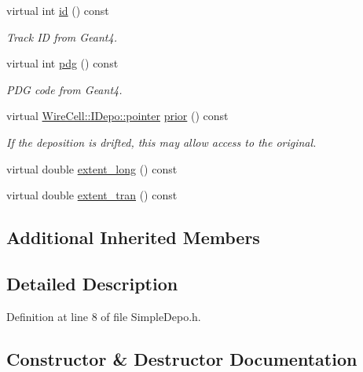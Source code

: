 \begin{DoxyCompactItemize}
virtual int \hyperlink{class_wire_cell_1_1_simple_depo_a30d9b06e6e65bba3d0b4fa17f64c52f5}{id} () const
\begin{DoxyCompactList}\small\item\em Track ID from Geant4. \end{DoxyCompactList}\item 
virtual int \hyperlink{class_wire_cell_1_1_simple_depo_a632331ca715c30e2600b2b115139fb0d}{pdg} () const
\begin{DoxyCompactList}\small\item\em P\+DG code from Geant4. \end{DoxyCompactList}\item 
virtual \hyperlink{class_wire_cell_1_1_i_data_aff870b3ae8333cf9265941eef62498bc}{Wire\+Cell\+::\+I\+Depo\+::pointer} \hyperlink{class_wire_cell_1_1_simple_depo_a23c734fee4ed0184b032e99a193f6f8e}{prior} () const
\begin{DoxyCompactList}\small\item\em If the deposition is drifted, this may allow access to the original. \end{DoxyCompactList}\item 
virtual double \hyperlink{class_wire_cell_1_1_simple_depo_aebb13d9a9c5a5bc0f821d2e690c88c46}{extent\+\_\+long} () const
\item 
virtual double \hyperlink{class_wire_cell_1_1_simple_depo_ac03d9904acf5117c23c363c7168310cd}{extent\+\_\+tran} () const
\end{DoxyCompactItemize}
\subsection*{Additional Inherited Members}


\subsection{Detailed Description}


Definition at line 8 of file Simple\+Depo.\+h.



\subsection{Constructor \& Destructor Documentation}
\mbox{\label{class_wire_cell_1_1_simple_depo_a9cd203c648b15f9213979a054a8696c5}} 
